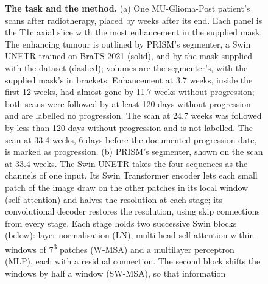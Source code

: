 \begin{figure}[!htbp]
\centering
{}
\caption{\textbf{The task and the method.} (a) One MU-Glioma-Post patient's scans after radiotherapy, placed by weeks
after its end. Each panel is the T1c axial slice with the most enhancement in the supplied mask. The enhancing tumour
is outlined by PRISM's segmenter, a Swin UNETR trained on BraTS 2021 \citep{hatamizadeh2022} (solid), and by the mask
supplied with the dataset (dashed); volumes are the segmenter's, with the supplied mask's in brackets. Enhancement at
3.7 weeks, inside the first 12 weeks, had almost gone by 11.7 weeks without progression; both scans were followed by
at least 120 days without progression and are labelled no progression. The scan at 24.7 weeks was followed by less
than 120 days without progression and is not labelled. The scan at 33.4 weeks, 6 days before the documented
progression date, is marked as progression. (b) PRISM's segmenter, shown on
the scan at 33.4 weeks. The Swin UNETR \citep{hatamizadeh2022} takes the four sequences as the channels of one input.
Its Swin Transformer encoder lets each small patch of the image draw on the other patches in its local window
(self-attention) and halves the resolution at each stage; its convolutional decoder restores the resolution, using
skip connections from every stage. Each stage holds two successive Swin blocks (below): layer normalisation (LN),
multi-head self-attention within windows of 7\textsuperscript{3} patches (W-MSA) and a multilayer perceptron (MLP),
each with a residual connection. The second block shifts the windows by half a window (SW-MSA), so that information
}
\end{figure}
